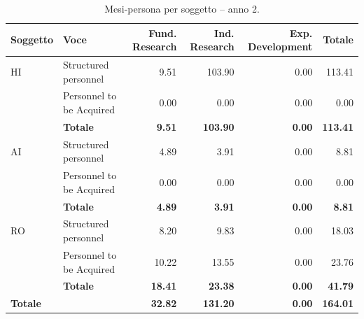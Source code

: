 \documentclass{plan4ari_report}
\begin{document}
\clearpage
\begin{table}[H]\centering\small\caption{Mesi-persona per soggetto -- anno 2.}\label{tab:wp-s-y2}
\begin{tabular}{llrrrr}\toprule\textbf{Soggetto} & \textbf{Voce} & \textbf{Fund. Research} & \textbf{Ind. Research} & \textbf{Exp. Development} & \textbf{Totale} \\\midrule
HI & Structured personnel & 9.51 & 103.90 & 0.00 & 113.41 \\
 & Personnel to be Acquired & 0.00 & 0.00 & 0.00 & 0.00 \\
 & \textbf{Totale} & \textbf{9.51} & \textbf{103.90} & \textbf{0.00} & \textbf{113.41} \\\midrule
AI & Structured personnel & 4.89 & 3.91 & 0.00 & 8.81 \\
 & Personnel to be Acquired & 0.00 & 0.00 & 0.00 & 0.00 \\
 & \textbf{Totale} & \textbf{4.89} & \textbf{3.91} & \textbf{0.00} & \textbf{8.81} \\\midrule
RO & Structured personnel & 8.20 & 9.83 & 0.00 & 18.03 \\
 & Personnel to be Acquired & 10.22 & 13.55 & 0.00 & 23.76 \\
 & \textbf{Totale} & \textbf{18.41} & \textbf{23.38} & \textbf{0.00} & \textbf{41.79} \\\midrule
\textbf{Totale} & & \textbf{32.82} & \textbf{131.20} & \textbf{0.00} & \textbf{164.01} \\
\bottomrule\end{tabular}\end{table}
\end{document}
